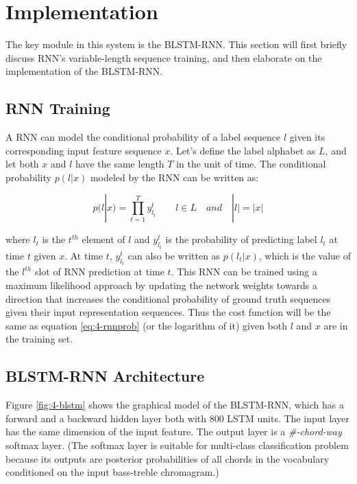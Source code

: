 \section{Implementation}\label{sec:4-blstm}
The key module in this system is the BLSTM-RNN. This section will first briefly discuss RNN's variable-length sequence training, and then elaborate on the implementation of the BLSTM-RNN.

\subsection{RNN Training}
A RNN can model the conditional probability of a label sequence $l$ given its corresponding input feature sequence $x$. Let's define the label alphabet as $L$, and let both $x$ and $l$ have the same length $T$ in the unit of time. The conditional probability $p(l|x)$ modeled by the RNN can be written as:

\begin{equation}\label{eq:4-rnnprob}
	p(l|x) = \prod_{t=1}^T y_{l_t}^t  \quad\quad l\in L \quad and \quad |l| = |x|
\end{equation}

where $l_t$ is the $t^{th}$ element of $l$ and $y_{l_t}^t$ is the probability of predicting label $l_t$ at time $t$ given $x$. At time $t$, $y_{l_t}^t$ can also be written as $p(l_t|x)$, which is the value of the $l^{th}$ slot of RNN prediction at time $t$. This RNN can be trained using a maximum likelihood approach by updating the network weights towards a direction that increases the conditional probability of ground truth sequences given their input representation sequences. Thus the cost function will be the same as equation \ref{eq:4-rnnprob} (or the logarithm of it) given both $l$ and $x$ are in the training set.

\subsection{BLSTM-RNN Architecture} \label{sec:blstmrnnarch}
Figure \ref{fig:4-blstm} shows the graphical model of the BLSTM-RNN, which has a forward and a backward hidden layer both with 800 LSTM units. The input layer has the same dimension of the input feature. The output layer is a \textit{\#-chord-way} softmax layer. (The softmax layer is suitable for multi-class classification problem because its outputs are posterior probabilities of all chords in the vocabulary conditioned on the input bass-treble chromagram.)

